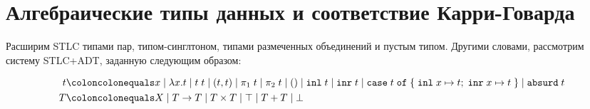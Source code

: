 \documentclass{article}
\DeclareMathOperator{\tstl}{\ \vdash\ }
\begin{document}
\section*{\centering Алгебраические типы данных и соответствие Карри-Говарда}
Расширим STLC типами пар, типом-синглтоном, типами размеченных объединений и пустым типом.
Другими словами, рассмотрим систему STLC+ADT, заданную следующим образом:
\begin{mdframed}[
    frametitle={\framebox{Syntax}},
    frametitlebelowskip=0,
    innertopmargin=0
]
\begin{align*}
    t &\coloncolonequals x
    \;|\; \lambda x.t \;|\; t\;t
    \;|\; (t,t) \;|\; \pi_1\;t \;|\; \pi_2\;t \;|\; ()
    \;|\; \mathtt{inl}\;t \;|\; \mathtt{inr}\;t
    \;|\; \mathtt{case}\;t\;\mathtt{of}\;\{\;
        \mathtt{inl}\;x\mapsto t;\;
        \mathtt{inr}\;x\mapsto t\;\}
    \;|\; \mathtt{absurd}\;t \\
    T &\coloncolonequals X
    \;|\; T \to T \;|\; T\times T \;|\; \top \;|\; T+T \;|\; \bot
\end{align*}
\end{mdframed}
\begin{mdframed}[
    frametitle={\framebox{$\Gamma\tstl t:T$}},
    frametitlebelowskip=0,
    innertopmargin=0
]
\end{mdframed}
\end{document}
